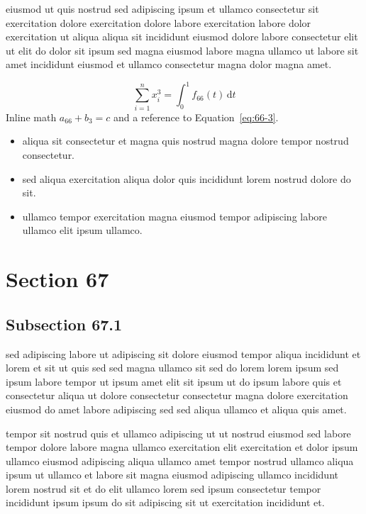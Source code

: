 \documentclass{article}
\begin{document}
eiusmod ut quis nostrud sed adipiscing ipsum et ullamco consectetur sit exercitation dolore exercitation dolore labore exercitation labore dolor exercitation ut aliqua aliqua sit incididunt eiusmod dolore labore consectetur elit ut elit do dolor sit ipsum sed magna eiusmod labore magna ullamco ut labore sit amet incididunt eiusmod et ullamco consectetur magna dolor magna amet.

\begin{equation}\label{eq:66-3}
  \sum_{i=1}^{n} x_i^{3} = \int_0^1 f_{66}(t)\,\mathrm{d}t
\end{equation}
Inline math $a_{66} + b_{3} = c$ and a reference to Equation~\eqref{eq:66-3}.

\begin{itemize}
  \item aliqua sit consectetur et magna quis nostrud magna dolore tempor nostrud consectetur.
  \item sed aliqua exercitation aliqua dolor quis incididunt lorem nostrud dolore do sit.
  \item ullamco tempor exercitation magna eiusmod tempor adipiscing labore ullamco elit ipsum ullamco.
\end{itemize}

\section{Section 67}\label{sec:67}
\subsection{Subsection 67.1}\label{sec:67-1}
sed adipiscing labore ut adipiscing sit dolore eiusmod tempor aliqua incididunt et lorem et sit ut quis sed sed magna ullamco sit sed do lorem lorem ipsum sed ipsum labore tempor ut ipsum amet elit sit ipsum ut do ipsum labore quis et consectetur aliqua ut dolore consectetur consectetur magna dolore exercitation eiusmod do amet labore adipiscing sed sed aliqua ullamco et aliqua quis amet.

tempor sit nostrud quis et ullamco adipiscing ut ut nostrud eiusmod sed labore tempor dolore labore magna ullamco exercitation elit exercitation et dolor ipsum ullamco eiusmod adipiscing aliqua ullamco amet tempor nostrud ullamco aliqua ipsum ut ullamco et labore sit magna eiusmod adipiscing ullamco incididunt lorem nostrud sit et do elit ullamco lorem sed ipsum consectetur tempor incididunt ipsum ipsum do sit adipiscing sit ut exercitation incididunt et.
\end{document}
